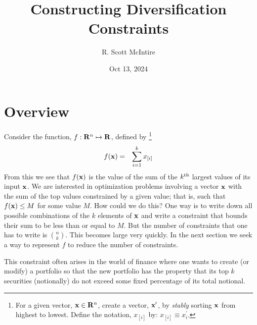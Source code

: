 \documentclass[12pt]{article}
\title{Constructing Diversification Constraints}
\author{R. Scott McIntire}
\date{Oct 13, 2024}
\begin{document}
\maketitle

\section{Overview}
Consider the function, $f: {\bf R}^n \mapsto {\bf R}$, defined by%
\footnote{
For a given vector, ${\bf x} \in {\bf R}^n$, create a vector,  
${\bf x}^\prime$,
by {\it stably\/} sorting ${\bf x}$ from highest to lowest.
Define the notation, $x_{[i]}$ by: $x_{[i]} \equiv x_{i}^\prime$.}
\begin{eqnarray}
	f({\bf x}) & = & \sum_{i=1}^k x_{[i]} 
\end{eqnarray}
From this we see that $f({\bf x})$ is the value of the sum of the $k^{\rm th}$ 
largest values of its input ${\bf x}$.
We are interested in optimization problems involving a vector ${\bf x}$ 
with the sum of the top values constrained by a given value; that is, 
such that $f({\bf x}) \le M$  for some value $M$.
How could we do this? One way is to write down all possible combinations of the 
$k$ elements of ${\bf x}$ and write a constraint that bounds their sum to be 
less than or equal to $M$.  But the number of constraints that one has to 
write is $n \choose k$. This becomes large very quickly. 
In the next section we seek a way to represent $f$ to 
reduce the number of constraints.

This constraint often arises in the world of finance where one wants to 
create (or modify) a portfolio so that the new portfolio has the property
that its top $k$ securities (notionally) do not exceed some fixed percentage 
of its total notional.
\end{document}
